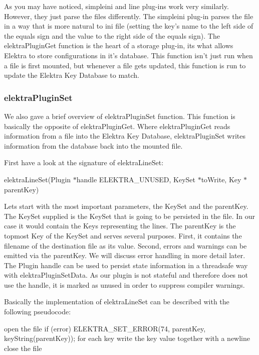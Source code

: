 As you may have noticed, simpleini and line plug-\/ins work very similarly. However, they just parse the files differently. The simpleini plug-\/in parses the file in a way that is more natural to ini file (setting the key's name to the left side of the equals sign and the value to the right side of the equals sign). The {\ttfamily elektra\+Plugin\+Get} function is the heart of a storage plug-\/in, its what allows Elektra to store configurations in it's database. This function isn't just run when a file is first mounted, but whenever a file gets updated, this function is run to update the Elektra Key Database to match.

\subsubsection*{elektra\+Plugin\+Set}

We also gave a brief overview of {\ttfamily elektra\+Plugin\+Set} function. This function is basically the opposite of {\ttfamily elektra\+Plugin\+Get}. Where {\ttfamily elektra\+Plugin\+Get} reads information from a file into the Elektra Key Database, {\ttfamily elektra\+Plugin\+Set} writes information from the database back into the mounted file.

First have a look at the signature of {\ttfamily elektra\+Line\+Set}\+:

{\ttfamily elektra\+Line\+Set(\+Plugin $\ast$handle E\+L\+E\+K\+T\+R\+A\+\_\+\+U\+N\+U\+S\+E\+D, Key\+Set $\ast$to\+Write, Key $\ast$parent\+Key)}

Lets start with the most important parameters, the Key\+Set and the {\ttfamily parent\+Key}. The Key\+Set supplied is the Key\+Set that is going to be persisted in the file. In our case it would contain the Keys representing the lines. The {\ttfamily parent\+Key} is the topmost Key of the Key\+Set and serves several purposes. First, it contains the filename of the destination file as its value. Second, errors and warnings can be emitted via the parent\+Key. We will discuss error handling in more detail later. The Plugin handle can be used to persist state information in a threadsafe way with {\ttfamily elektra\+Plugin\+Set\+Data}. As our plugin is not stateful and therefore does not use the handle, it is marked as unused in order to suppress compiler warnings.

Basically the implementation of {\ttfamily elektra\+Line\+Set} can be described with the following pseudocode\+: \begin{DoxyVerb}    open the file
    if (error)
    {
            ELEKTRA_SET_ERROR(74, parentKey, keyString(parentKey));
    }
    for each key
    {
            write the key value together with a newline
    }
    close the file
\end{DoxyVerb}


